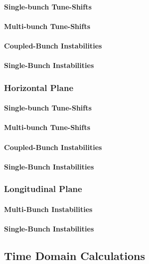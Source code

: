 \documentclass[
	12pt,				%
	openright,			%
	oneside,			%
	a4paper,		%
	chapter=TITLE,		%
	section=TITLE,		%
    brazil,				%
	english,			%
	sumario=tradicional,
	]{abntex2}
\begin{document}
        \paragraph{Single-bunch Tune-Shifts}
        \paragraph{Multi-bunch Tune-Shifts}
        \paragraph{Coupled-Bunch Instabilities}
        \paragraph{Single-Bunch Instabilities}
      \subsubsection{Horizontal Plane}
        \paragraph{Single-bunch Tune-Shifts}
        \paragraph{Multi-bunch Tune-Shifts}
        \paragraph{Coupled-Bunch Instabilities}
        \paragraph{Single-Bunch Instabilities}
      \subsubsection{Longitudinal Plane}
        \paragraph{Multi-Bunch Instabilities}
        \paragraph{Single-Bunch Instabilities}
    \subsection{Time Domain Calculations}
\end{document}
